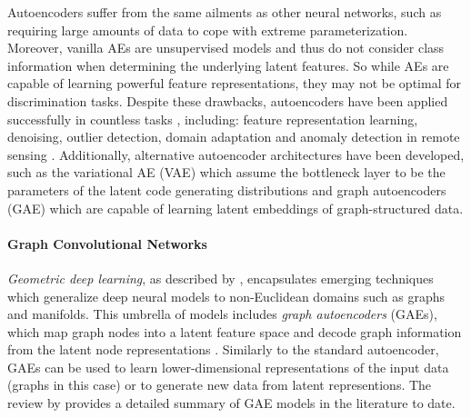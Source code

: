 Autoencoders suffer from the same ailments as other neural networks, such as requiring large amounts of data to cope with extreme parameterization.  Moreover, vanilla AEs are unsupervised models and thus do not consider class information when determining the underlying latent features. So while AEs are capable of learning powerful feature representations, they may not be optimal for discrimination tasks.  Despite these drawbacks, autoencoders have been applied successfully in countless tasks \citep{Tschannen2018RecentAdvancesAutoencoder, Yuan2019AutoencoderSurvey, Chen2019DeepAutoencoders, Kosiorek2019StackedCapsuleAutoencoders}, including: feature representation learning, denoising, outlier detection, domain adaptation and anomaly detection in remote sensing \citep{Bengio2014RepLearningReview}.  Additionally, alternative autoencoder architectures have been developed, such as the variational AE (VAE) which assume the bottleneck layer to be the parameters of the latent code generating distributions \citep{Ghaffarzadegan2018MILVAE, Dai2017VariationalAutoencoder} and graph autoencoders (GAE) \citep{Wu2019SurveyGraphConvolutionalNeuralNetworks} which are capable of learning latent embeddings of graph-structured data.

\paragraph{Graph Convolutional Networks} \label{sec:Graph_CNN}
\textit{Geometric deep learning}, as described by \citep{Bronstein2017GeometricDeepLearning}, encapsulates emerging techniques which generalize deep neural models to non-Euclidean domains such as graphs and manifolds.  This umbrella of models includes \textit{graph autoencoders} (GAEs), which map graph nodes into a latent feature space and decode graph information from the latent node representations \citep{Wu2019SurveyGraphConvolutionalNeuralNetworks, Liu2018ConstrainedGraphVariationalAutoencoders, Pan2018AdversariallyRegGraphAutoencoder}.  Similarly to the standard autoencoder, GAEs can be used to learn lower-dimensional representations of the input data (graphs in this case) or to generate new data from latent representions.  The review by \citep{Wu2019SurveyGraphConvolutionalNeuralNetworks} provides a detailed summary of GAE models in the literature to date.


